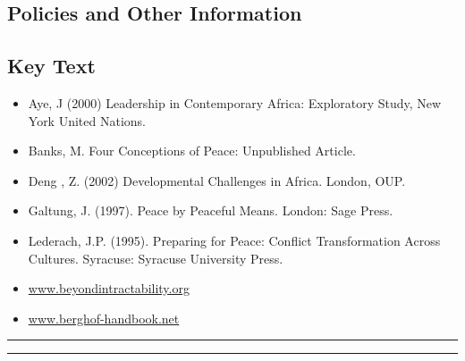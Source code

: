 \subsection*{Policies and Other Information}
\subsection*{Key Text}
\begin{itemize}
    \item Aye, J (2000) Leadership in Contemporary Africa: Exploratory Study, New York United Nations.
    \item Banks, M. Four Conceptions of Peace: Unpublished Article.
    \item Deng , Z. (2002) Developmental Challenges in Africa. London, OUP.
    \item Galtung, J. (1997). Peace by Peaceful Means. London: Sage Press.
    \item Lederach, J.P. (1995). Preparing for Peace: Conflict Transformation Across Cultures. Syracuse: Syracuse University Press.
    \item \href{www.beyondintractability.org}{www.beyondintractability.org}
    \item \href{www.berghof-handbook.net}{www.berghof-handbook.net}
\end{itemize}
\vspace{2ex}\hrule
\vspace{2ex}\hrule\vspace{2ex}